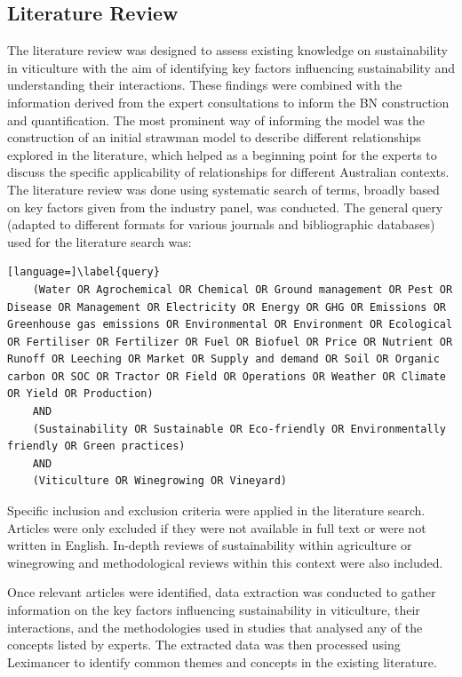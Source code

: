 \documentclass[fleqn,10pt]{wlscirep}
\begin{document}
\subsection{Literature Review}

The literature review was designed to assess existing knowledge on sustainability in viticulture with the aim of identifying key factors influencing sustainability and understanding their interactions. These findings were combined with the information derived from the expert consultations to inform the BN construction and quantification. The most prominent way of informing the model was the construction of an initial strawman model to describe different relationships explored in the literature, which helped as a beginning point for the experts to discuss the specific applicability of relationships for different Australian contexts. The literature review was done using systematic search of terms, broadly based on key factors given from the industry panel, was conducted. The general query (adapted to different formats for various journals and bibliographic databases) used for the literature search was: 

\begin{lstlisting}[language=]\label{query}
    (Water OR Agrochemical OR Chemical OR Ground management OR Pest OR Disease OR Management OR Electricity OR Energy OR GHG OR Emissions OR Greenhouse gas emissions OR Environmental OR Environment OR Ecological OR Fertiliser OR Fertilizer OR Fuel OR Biofuel OR Price OR Nutrient OR Runoff OR Leeching OR Market OR Supply and demand OR Soil OR Organic carbon OR SOC OR Tractor OR Field OR Operations OR Weather OR Climate OR Yield OR Production)
    AND
    (Sustainability OR Sustainable OR Eco-friendly OR Environmentally friendly OR Green practices)
    AND
    (Viticulture OR Winegrowing OR Vineyard)
    \end{lstlisting}

Specific inclusion and exclusion criteria were applied in the literature search. Articles were only excluded if they were not available in full text or were not written in English. In-depth reviews of sustainability within agriculture or winegrowing and methodological reviews within this context were also included.

Once relevant articles were identified, data extraction was conducted to gather information on the key factors influencing sustainability in viticulture, their interactions, and the methodologies used in studies that analysed any of the concepts listed by experts. The extracted data was then processed using Leximancer to identify common themes and concepts in the existing literature.
\end{document}
